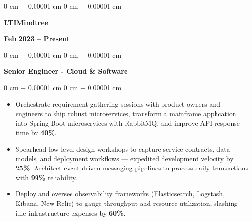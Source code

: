 \documentclass[10pt, letterpaper]{article}
\newenvironment{highlights}{
    \begin{itemize}[
        topsep=0.10 cm,
        parsep=0.10 cm,
        partopsep=0pt,
        itemsep=0pt,
        leftmargin=0 cm + 10pt
    ]
}{
    \end{itemize}
} %
\newenvironment{onecolentry}{
    \begin{adjustwidth}{
        0 cm + 0.00001 cm
    }{
        0 cm + 0.00001 cm
    }
}{
    \end{adjustwidth}
} %
\newenvironment{twocolentry}[2][]{
    \onecolentry
    \def\secondColumn{#2}
    \setcolumnwidth{\fill, 4.5 cm}
    \begin{paracol}{2}
}{
    \switchcolumn \raggedleft \secondColumn
    \end{paracol}
    \endonecolentry
} %
\begin{document}
        \begin{twocolentry}{\textbf{Feb 2023 – Present}}
            \textbf{LTIMindtree} 
            \end{twocolentry}
            \begin{onecolentry}
                \textbf{Senior Engineer - Cloud \& Software}
            \end{onecolentry}
        \vspace{0.10 cm}
        \begin{onecolentry}
            \begin{highlights}
                \item Orchestrate requirement-gathering sessions with product owners and engineers to ship robust microservices, transform a mainframe application into Spring Boot microservices with RabbitMQ, and improve API response time by \textbf{40\%}.
                
                
                \item Spearhead low-level design workshops to capture service contracts, data models, and deployment workflows — expedited development velocity by \textbf{25\%}. Architect event-driven messaging pipelines to process daily transactions with \textbf{99\%} reliability. 

                \item Deploy and oversee observability frameworks (Elasticsearch, Logstash, Kibana, New Relic) to gauge throughput and resource utilization, slashing idle infrastructure expenses by \textbf{60\%}.

            \end{highlights}
        \end{onecolentry}
\end{document}
